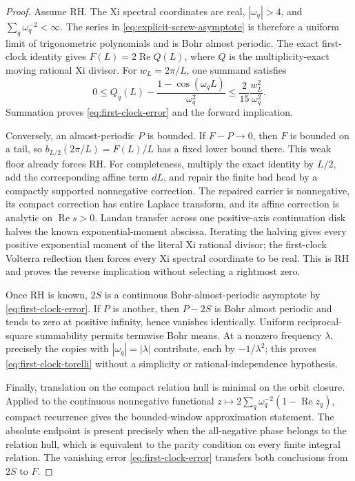 \documentclass[11pt]{article}
\theoremstyle{definition}
\theoremstyle{remark}
\newcommand{\Rea}{\operatorname{Re}}
\begin{document}
\begin{proof}
Assume RH.  The Xi spectral coordinates are real, $|\omega_q|>4$, and
$\sum_q\omega_q^{-2}<\infty$.  The series in \eqref{eq:explicit-screw-asymptote} is therefore a
uniform limit of trigonometric polynomials and is Bohr almost periodic.  The exact first-clock
identity gives $F(L)=2\Rea Q(L)$, where $Q$ is the multiplicity-exact moving rational Xi
divisor.  For $w_L=2\pi/L$, one summand satisfies
\[
 0\le Q_q(L)-\frac{1-\cos(\omega_qL)}{\omega_q^2}
 \le\frac2{15}\frac{w_L^2}{\omega_q^2}.
\]
Summation proves \eqref{eq:first-clock-error} and the forward implication.

Conversely, an almost-periodic $P$ is bounded.  If $F-P\to0$, then $F$ is bounded on a
tail, so $b_{L/2}(2\pi/L)=F(L)/L$ has a fixed lower bound there.  This weak floor already
forces RH.  For completeness, multiply the exact identity by $L/2$, add the corresponding
affine term $dL$, and repair the finite bad head by a compactly supported nonnegative
correction.  The repaired carrier is nonnegative, its compact correction has entire Laplace
transform, and its affine correction is analytic on $\Rea s>0$.  Landau transfer across one
positive-axis continuation disk halves the known exponential-moment abscissa.  Iterating the
halving gives every positive exponential moment of the literal Xi rational divisor; the
first-clock Volterra reflection then forces every Xi spectral coordinate to be real.  This is
RH and proves the reverse implication without selecting a rightmost zero.

Once RH is known, $2S$ is a continuous Bohr-almost-periodic asymptote by
\eqref{eq:first-clock-error}.  If $P$ is another, then $P-2S$ is Bohr almost periodic and tends
to zero at positive infinity, hence vanishes identically.  Uniform reciprocal-square
summability permits termwise Bohr means.  At a nonzero frequency $\lambda$, precisely the
copies with $|\omega_q|=|\lambda|$ contribute, each by $-1/\lambda^2$; this proves
\eqref{eq:first-clock-torelli} without a simplicity or rational-independence hypothesis.

Finally, translation on the compact relation hull is minimal on the orbit closure.  Applied to
the continuous nonnegative functional
$z\mapsto2\sum_q\omega_q^{-2}(1-\Rea z_q)$, compact recurrence gives the bounded-window
approximation statement.  The absolute endpoint is present precisely when the all-negative
phase belongs to the relation hull, which is equivalent to the parity condition on every finite
integral relation.  The vanishing error \eqref{eq:first-clock-error} transfers both conclusions
from $2S$ to $F$.
\end{proof}
\end{document}
